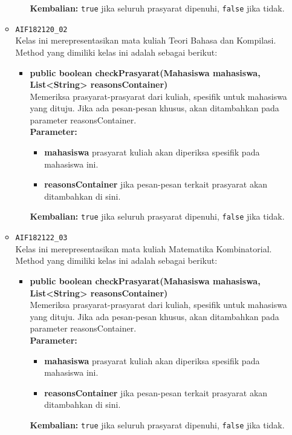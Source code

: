 \begin{enumerate}
\begin{itemize}
\begin{itemize}
\begin{itemize}
			\end{itemize}
			\textbf{Kembalian:} \texttt{true} jika seluruh prasyarat dipenuhi, \texttt{false} jika tidak.
		\end{itemize}
		\item \texttt{AIF182120\_02} \\
		Kelas ini merepresentasikan mata kuliah Teori Bahasa dan Kompilasi. Method yang dimiliki kelas ini adalah sebagai berikut: 
		\begin{itemize}
			\item \textbf{public boolean checkPrasyarat(Mahasiswa mahasiswa, List<String> reasonsContainer)}\\
			Memeriksa prasyarat-prasyarat dari kuliah, spesifik untuk mahasiswa yang dituju. Jika ada pesan-pesan khusus, akan ditambahkan pada parameter reasonsContainer.\\
			\textbf{Parameter:}
			\begin{itemize}
				\item \textbf{mahasiswa} prasyarat kuliah akan diperiksa spesifik pada mahasiswa ini.
				\item \textbf{reasonsContainer} jika pesan-pesan terkait prasyarat akan ditambahkan di sini.
			\end{itemize}
			\textbf{Kembalian:} \texttt{true} jika seluruh prasyarat dipenuhi, \texttt{false} jika tidak.
		\end{itemize}
		\item \texttt{AIF182122\_03} \\
		Kelas ini merepresentasikan mata kuliah Matematika Kombinatorial. Method yang dimiliki kelas ini adalah sebagai berikut: 
		\begin{itemize}
			\item \textbf{public boolean checkPrasyarat(Mahasiswa mahasiswa, List<String> reasonsContainer)}\\
			Memeriksa prasyarat-prasyarat dari kuliah, spesifik untuk mahasiswa yang dituju. Jika ada pesan-pesan khusus, akan ditambahkan pada parameter reasonsContainer.\\
			\textbf{Parameter:}
			\begin{itemize}
				\item \textbf{mahasiswa} prasyarat kuliah akan diperiksa spesifik pada mahasiswa ini.
				\item \textbf{reasonsContainer} jika pesan-pesan terkait prasyarat akan ditambahkan di sini.
			\end{itemize}
			\textbf{Kembalian:} \texttt{true} jika seluruh prasyarat dipenuhi, \texttt{false} jika tidak.

\end{itemize}
\end{itemize}
\end{enumerate}
